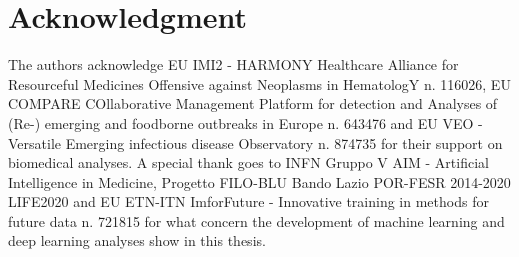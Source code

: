 \documentclass{standalone}
\begin{document}
\chapter*{Acknowledgment}

The authors acknowledge EU IMI2 - HARMONY Healthcare Alliance for Resourceful Medicines Offensive against Neoplasms in HematologY n. 116026, EU COMPARE COllaborative Management Platform for detection and Analyses of (Re-) emerging and foodborne outbreaks in Europe n. 643476 and EU VEO - Versatile Emerging infectious disease Observatory n. 874735 for their support on biomedical analyses.
A special thank goes to INFN Gruppo V AIM - Artificial Intelligence in Medicine, Progetto FILO-BLU Bando Lazio POR-FESR 2014-2020 LIFE2020 and EU ETN-ITN ImforFuture - Innovative training in methods for future data n. 721815 for what concern the development of machine learning and deep learning analyses show in this thesis.
\end{document}
